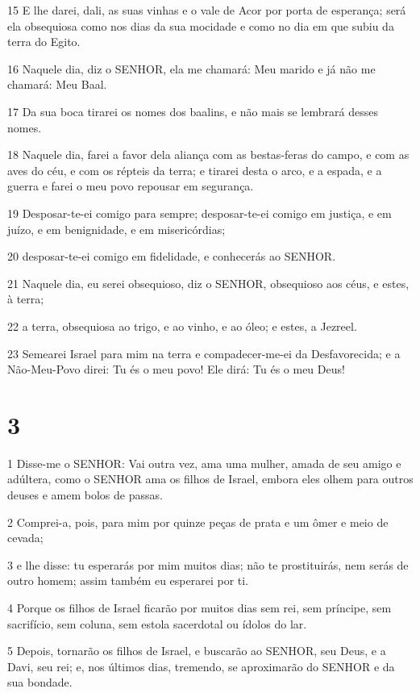 \par 15 E lhe darei, dali, as suas vinhas e o vale de Acor por porta de esperança; será ela obsequiosa como nos dias da sua mocidade e como no dia em que subiu da terra do Egito.
\par 16 Naquele dia, diz o SENHOR, ela me chamará: Meu marido e já não me chamará: Meu Baal.
\par 17 Da sua boca tirarei os nomes dos baalins, e não mais se lembrará desses nomes.
\par 18 Naquele dia, farei a favor dela aliança com as bestas-feras do campo, e com as aves do céu, e com os répteis da terra; e tirarei desta o arco, e a espada, e a guerra e farei o meu povo repousar em segurança.
\par 19 Desposar-te-ei comigo para sempre; desposar-te-ei comigo em justiça, e em juízo, e em benignidade, e em misericórdias;
\par 20 desposar-te-ei comigo em fidelidade, e conhecerás ao SENHOR.
\par 21 Naquele dia, eu serei obsequioso, diz o SENHOR, obsequioso aos céus, e estes, à terra;
\par 22 a terra, obsequiosa ao trigo, e ao vinho, e ao óleo; e estes, a Jezreel.
\par 23 Semearei Israel para mim na terra e compadecer-me-ei da Desfavorecida; e a Não-Meu-Povo direi: Tu és o meu povo! Ele dirá: Tu és o meu Deus!

\chapter{3}

\par 1 Disse-me o SENHOR: Vai outra vez, ama uma mulher, amada de seu amigo e adúltera, como o SENHOR ama os filhos de Israel, embora eles olhem para outros deuses e amem bolos de passas.
\par 2 Comprei-a, pois, para mim por quinze peças de prata e um ômer e meio de cevada;
\par 3 e lhe disse: tu esperarás por mim muitos dias; não te prostituirás, nem serás de outro homem; assim também eu esperarei por ti.
\par 4 Porque os filhos de Israel ficarão por muitos dias sem rei, sem príncipe, sem sacrifício, sem coluna, sem estola sacerdotal ou ídolos do lar.
\par 5 Depois, tornarão os filhos de Israel, e buscarão ao SENHOR, seu Deus, e a Davi, seu rei; e, nos últimos dias, tremendo, se aproximarão do SENHOR e da sua bondade.

